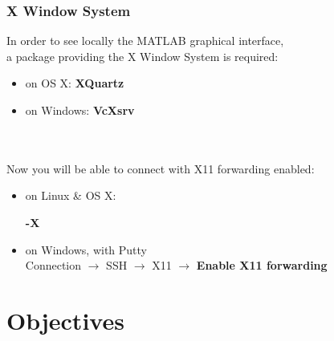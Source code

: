 \documentclass{beamer}
\begin{document}
\begin{frame}[fragile]
\frametitle{X Window System}
  In order to see locally the MATLAB graphical interface, \\
  a package providing the X Window System is required:
  \begin{itemize}
    \item on OS X: \textbf{XQuartz} \hfill{}
    \item on Windows: \textbf{VcXsrv} \hfill{}
  \end{itemize}
  \hfill \\ \hfill \\ %
  
  Now you will be able to connect with X11 forwarding enabled:
  \begin{itemize}
    \item on Linux \& OS X: \\
    \begin{cmdline}
        \textbf{-X}
    \end{cmdline}
    \item on Windows, with Putty \\
     Connection $\rightarrow$ SSH $\rightarrow$ X11 $\rightarrow$ \textbf{Enable X11 forwarding}
  \end{itemize}  
\end{frame}

\section{Objectives}
\end{document}
